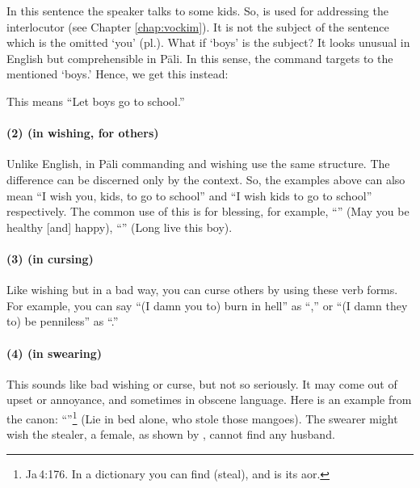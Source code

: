
In this sentence the speaker talks to some kids. So,  is used for addressing the interlocutor (see Chapter \ref{chap:vockim}). It is not the subject of the sentence which is the omitted `you' (pl.). What if `boys' is the subject? It looks unusual in English but comprehensible in P\=ali. In this sense, the command targets to the mentioned `boys.' Hence, we get this instead:


This means ``Let boys go to school.''

\paragraph*{(2)  (in wishing, for others)} Unlike English, in P\=ali commanding and wishing use the same structure. The difference can be discerned only by the context. So, the examples above can also mean ``I wish you, kids, to go to school'' and ``I wish kids to go to school'' respectively. The common use of this is for blessing, for example, ``'' (May you be healthy [and] happy), ``'' (Long live this boy).

\paragraph*{(3)  (in cursing)} Like wishing but in a bad way, you can curse others by using these verb forms. For example, you can say ``(I damn you to) burn in hell'' as ``,'' or ``(I damn they to) be penniless'' as ``.''

\paragraph*{(4)  (in swearing)} This sounds like bad wishing or curse, but not so seriously. It may come out of upset or annoyance, and sometimes in obscene language. Here is an example from the canon: ``''\footnote{Ja\,4:176. In a dictionary you can find  (steal), and  is its aor.} (Lie in bed alone, who stole those mangoes). The swearer might wish the stealer, a female, as shown by , cannot find any husband.

